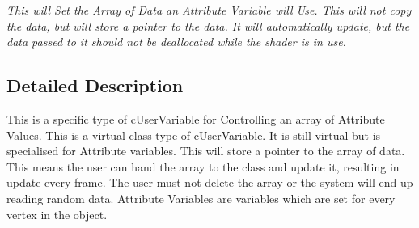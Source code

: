 \begin{DoxyCompactItemize}
\begin{DoxyCompactList}\small\item\em This will Set the Array of Data an Attribute Variable will Use. This will not copy the data, but will store a pointer to the data. It will automatically update, but the data passed to it should not be deallocated while the shader is in use. \end{DoxyCompactList}\end{DoxyCompactItemize}


\subsection{Detailed Description}
This is a specific type of \hyperlink{classc_user_variable}{cUserVariable} for Controlling an array of Attribute Values. This is a virtual class type of \hyperlink{classc_user_variable}{cUserVariable}. It is still virtual but is specialised for Attribute variables. This will store a pointer to the array of data. This means the user can hand the array to the class and update it, resulting in update every frame. The user must not delete the array or the system will end up reading random data. Attribute Variables are variables which are set for every vertex in the object. 
